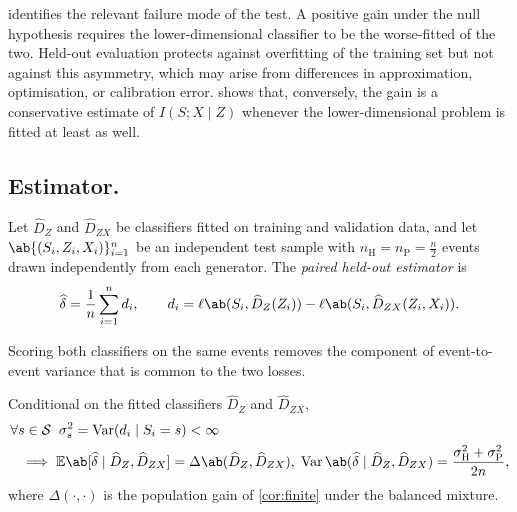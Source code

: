 \documentclass[12pt]{article}
\newcommand{\Herwig}{\mathrm{H}}
\newcommand{\Pythia}{\mathrm{P}}
\newcommand{\E}{\mathbb{E}}
\newcommand{\Gens}{\mathcal{S}}
\newcommand{\1}{\mathbbm{1}}
\renewcommand{\[}{\begin{equation}}
\renewcommand{\]}{\end{equation}}
\begin{document}
     identifies the relevant failure mode of the test.
    A positive gain under the null hypothesis requires the lower-dimensional classifier to be the worse-fitted of the two.
    Held-out evaluation protects against overfitting of the training set but not against this asymmetry, which may arise from differences in approximation, optimisation, or calibration error.
     shows that, conversely, the gain is a conservative estimate of \(I(S;X\mid Z)\) whenever the lower-dimensional problem is fitted at least as well.

    \subsection{Estimator.}

    \begin{definition}
            Let \(\widehat D_Z\) and \(\widehat D_{ZX}\) be classifiers fitted on training and validation data, and let \( \ab\{(S_i,Z_i,X_i)\}_{i=1}^{n} \) be an independent test sample with \( n_\Herwig = n_\Pythia = \frac n2 \) events drawn independently from each generator.
            The \emph{paired held-out estimator} is
            \[
            \label{eq:delta-hat}
                \widehat\delta =\frac1n\sum_{i=1}^nd_i,\qquad d_i = \ell \ab( S_i, \widehat D_Z(Z_i))-\ell \ab( S_i, \widehat D_{ZX}( Z_i, X_i) ).
            \]
    \end{definition}
    
    Scoring both classifiers on the same events removes the component of event-to-event variance that is common to the two losses.

\begin{proposition}
    \label{prop:estimator}
        Conditional on the fitted classifiers \(\widehat D_Z\) and \(\widehat D_{ZX}\),
        \[
        \label{eq:estimator-moments}
        \begin{split}
            \forall &s\in\Gens\;\;\sigma_s^2 = \operatorname{Var}(d_i\mid S_i=s)<\infty\\
            &\implies\E\ab[\widehat\delta\mid \widehat D_Z,\widehat D_{ZX}]=\Delta\ab(\widehat D_Z,\widehat D_{ZX}), \;
            \operatorname{Var}\ab(\widehat\delta\mid \widehat D_Z,\widehat D_{ZX})=\frac{\sigma_\Herwig^2 + \sigma_\Pythia^2}{2n},
        \end{split}
        \]
        where \(\Delta(\cdot,\cdot)\) is the population gain of \cref{cor:finite} under the balanced mixture.
    \end{proposition}
\end{document}
